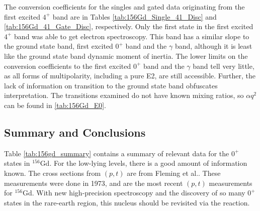 The conversion coefficients for the singles and gated data originating from the first excited $4^+$ band are in Tables \ref{tab:156Gd_Single_41_Disc} and \ref{tab:156Gd_41_Gate_Disc}, respectively. Only the first state in the first excited $4^+$ band was able to get electron spectroscopy. This band has a similar slope to the ground state band, first excited $0^+$ band and the $\gamma$ band, although it is least like the ground state band dynamic moment of inertia. The lower limits on the conversion coefficients to the first excited $0^+$ band and the $\gamma$ band tell very little, as all forms of multipolarity, including a pure E2, are still accessible. Further, the lack of information on transition to the ground state band obfuscates interpretation. The transitions examined do not have known mixing ratios, so $\alpha q^2$ can be found in \ref{tab:156Gd_E0}.





\subsection{Summary and Conclusions}

Table \ref{tab:156gd_summary} contains a summary of relevant data for the $0^+$ states in $^{156}$Gd. For the low-lying levels, there is a good amount of information known. The cross sections from $(p,t)$ are from Fleming et al.\citep{fleming73:_156gd}. These measurements were done in 1973, and are the most recent $(p,t)$ measurements for $^{156}$Gd. With new high-precision spectroscopy and the discovery of so many $0^+$ states in the rare-earth region, this nucleus should be revisited via the reaction.

